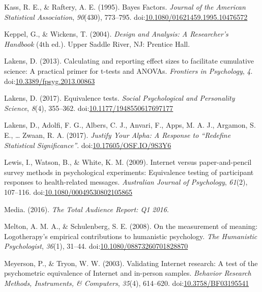 \documentclass[english,man, mask]{apa6}
\theoremstyle{definition}
\theoremstyle{definition}
\theoremstyle{definition}
\theoremstyle{remark}
\begin{document}
\hypertarget{ref-Kass1995}{}
Kass, R. E., \& Raftery, A. E. (1995). Bayes Factors. \emph{Journal of
the American Statistical Association}, \emph{90}(430), 773--795.
doi:\href{https://doi.org/10.1080/01621459.1995.10476572}{10.1080/01621459.1995.10476572}

\hypertarget{ref-Keppel2004}{}
Keppel, G., \& Wickens, T. (2004). \emph{Design and Analysis: A
Researcher's Handbook} (4th ed.). Upper Saddle River, NJ: Prentice Hall.

\hypertarget{ref-Lakens2013}{}
Lakens, D. (2013). Calculating and reporting effect sizes to facilitate
cumulative science: A practical primer for t-tests and ANOVAs.
\emph{Frontiers in Psychology}, \emph{4}.
doi:\href{https://doi.org/10.3389/fpsyg.2013.00863}{10.3389/fpsyg.2013.00863}

\hypertarget{ref-Lakens2017a}{}
Lakens, D. (2017). Equivalence tests. \emph{Social Psychological and
Personality Science}, \emph{8}(4), 355--362.
doi:\href{https://doi.org/10.1177/1948550617697177}{10.1177/1948550617697177}

\hypertarget{ref-Lakens2017}{}
Lakens, D., Adolfi, F. G., Albers, C. J., Anvari, F., Apps, M. A. J.,
Argamon, S. E., \ldots{} Zwaan, R. A. (2017). \emph{Justify Your Alpha:
A Response to ``Redefine Statistical Significance''}.
doi:\href{https://doi.org/10.17605/OSF.IO/9S3Y6}{10.17605/OSF.IO/9S3Y6}

\hypertarget{ref-Lewis2009}{}
Lewis, I., Watson, B., \& White, K. M. (2009). Internet versus
paper-and-pencil survey methods in psychological experiments:
Equivalence testing of participant responses to health-related messages.
\emph{Australian Journal of Psychology}, \emph{61}(2), 107--116.
doi:\href{https://doi.org/10.1080/00049530802105865}{10.1080/00049530802105865}

\hypertarget{ref-Media2016}{}
Media. (2016). \emph{The Total Audience Report: Q1 2016}.

\hypertarget{ref-Melton2008}{}
Melton, A. M. A., \& Schulenberg, S. E. (2008). On the measurement of
meaning: Logotherapy's empirical contributions to humanistic psychology.
\emph{The Humanistic Psychologist}, \emph{36}(1), 31--44.
doi:\href{https://doi.org/10.1080/08873260701828870}{10.1080/08873260701828870}

\hypertarget{ref-Meyerson2003}{}
Meyerson, P., \& Tryon, W. W. (2003). Validating Internet research: A
test of the psychometric equivalence of Internet and in-person samples.
\emph{Behavior Research Methods, Instruments, \& Computers},
\emph{35}(4), 614--620.
doi:\href{https://doi.org/10.3758/BF03195541}{10.3758/BF03195541}
\end{document}
